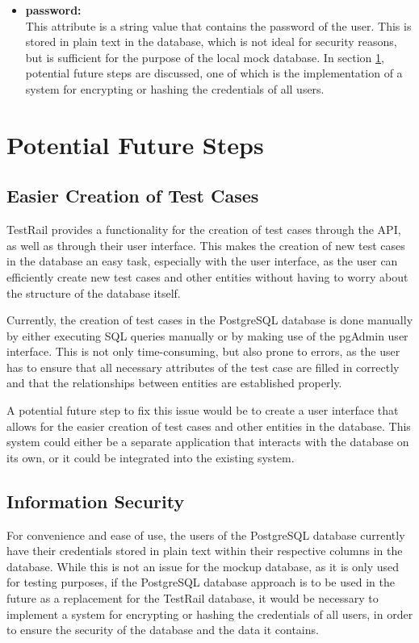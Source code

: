 \begin{itemize}
    \item \textbf{password:} \\
    This attribute is a string value that contains the password of the user. This is stored in plain text in the database, which is not ideal for security reasons, but is sufficient for the purpose of the local mock database. In section \ref{sec:potential-future-steps}, potential future steps are discussed, one of which is the implementation of a system for encrypting or hashing the credentials of all users.
\end{itemize}

\section{Potential Future Steps} \label{sec:potential-future-steps}

\subsection{Easier Creation of Test Cases}

TestRail provides a functionality for the creation of test cases through the API, as well as through their user interface. This makes the creation of new test cases in the database an easy task, especially with the user interface, as the user can efficiently create new test cases and other entities without having to worry about the structure of the database itself.

Currently, the creation of test cases in the PostgreSQL database is done manually by either executing SQL queries manually or by making use of the pgAdmin user interface. This is not only time-consuming, but also prone to errors, as the user has to ensure that all necessary attributes of the test case are filled in correctly and that the relationships between entities are established properly.

A potential future step to fix this issue would be to create a user interface that allows for the easier creation of test cases and other entities in the database. This system could either be a separate application that interacts with the database on its own, or it could be integrated into the existing system. 

\subsection{Information Security}

For convenience and ease of use, the users of the PostgreSQL database currently have their credentials stored in plain text within their respective columns in the database. While this is not an issue for the mockup database, as it is only used for testing purposes, if the PostgreSQL database approach is to be used in the future as a replacement for the TestRail database, it would be necessary to implement a system for encrypting or hashing the credentials of all users, in order to ensure the security of the database and the data it contains. 

